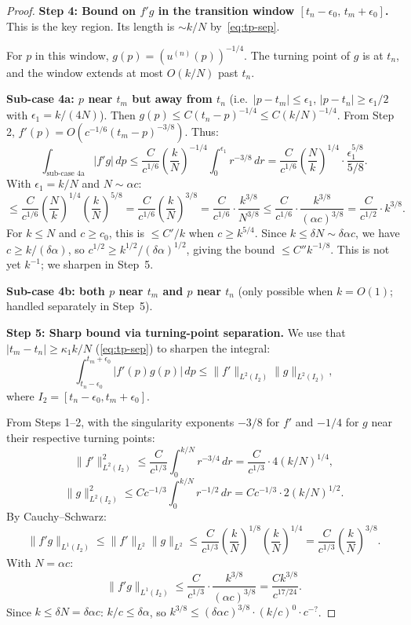 \documentclass[12pt,a4paper]{amsart}
\theoremstyle{definition}
\newcommand{\norm}[1]{\|#1\|}
\newcommand{\dd}{\,d}
\begin{document}
\begin{proof}
\medskip
\noindent\textbf{Step 4: Bound on $f' g$ in the transition window $[t_n - \epsilon_0,\, t_m + \epsilon_0]$.}
This is the key region. Its length is $\sim k/N$ by~\eqref{eq:tp-sep}.

For $p$ in this window, $g(p) = (u^{(n)}(p))^{-1/4}$.
The turning point of $g$ is at $t_n$, and the window
extends at most $O(k/N)$ past $t_n$.

\textbf{Sub-case 4a: $p$ near $t_m$ but away from $t_n$}
(i.e.\ $|p - t_m| \leq \epsilon_1$, $|p - t_n| \geq \epsilon_1/2$
with $\epsilon_1 = k/(4N)$).
Then $g(p) \leq C (t_n - p)^{-1/4} \leq C (k/N)^{-1/4}$.
From Step 2, $f'(p) = O(c^{-1/6}(t_m-p)^{-3/8})$. Thus:
\[
  \int_{\text{sub-case 4a}} |f'g|\dd p
  \leq \frac{C}{c^{1/6}}\left(\frac{k}{N}\right)^{-1/4}
      \int_0^{\epsilon_1} r^{-3/8}\dd r
  = \frac{C}{c^{1/6}}\left(\frac{N}{k}\right)^{1/4}
      \cdot \frac{\epsilon_1^{5/8}}{5/8}.
\]
With $\epsilon_1 = k/N$ and $N \sim \alpha c$:
\[
  \leq \frac{C}{c^{1/6}}\left(\frac{N}{k}\right)^{1/4}
    \left(\frac{k}{N}\right)^{5/8}
  = \frac{C}{c^{1/6}}\left(\frac{k}{N}\right)^{3/8}
  = \frac{C}{c^{1/6}}\cdot\frac{k^{3/8}}{N^{3/8}}
  \leq \frac{C}{c^{1/6}}\cdot\frac{k^{3/8}}{(\alpha c)^{3/8}}
  = \frac{C}{c^{1/2}}\cdot k^{3/8}.
\]
For $k \leq N$ and $c \geq c_0$, this is $\leq C' / k$ when $c \geq k^{5/4}$.
Since $k \leq \delta N \sim \delta\alpha c$, we have $c \geq k/(\delta\alpha)$,
so $c^{1/2} \geq k^{1/2}/(\delta\alpha)^{1/2}$,
giving the bound $\leq C'' k^{-1/8}$.
This is not yet $k^{-1}$; we sharpen in Step~5.

\textbf{Sub-case 4b: both $p$ near $t_m$ and $p$ near $t_n$}
(only possible when $k = O(1)$; handled separately in Step~5).

\medskip
\noindent\textbf{Step 5: Sharp bound via turning-point separation.}
We use that $|t_m - t_n| \geq \kappa_1 k/N$ (\eqref{eq:tp-sep})
to sharpen the integral:
\[
  \int_{t_n-\epsilon_0}^{t_m+\epsilon_0} |f'(p)g(p)|\dd p
  \leq \norm{f'}_{L^2(I_2)}\norm{g}_{L^2(I_2)},
\]
where $I_2 = [t_n - \epsilon_0, t_m + \epsilon_0]$.

From Steps 1--2, with the singularity exponents $-3/8$ for $f'$
and $-1/4$ for $g$ near their respective turning points:
\[
  \norm{f'}_{L^2(I_2)}^2
  \leq \frac{C}{c^{1/3}}\int_0^{k/N} r^{-3/4}\dd r
  = \frac{C}{c^{1/3}}\cdot 4(k/N)^{1/4},
\]
\[
  \norm{g}_{L^2(I_2)}^2
  \leq C c^{-1/3}\int_0^{k/N} r^{-1/2}\dd r
  = C c^{-1/3}\cdot 2(k/N)^{1/2}.
\]
By Cauchy--Schwarz:
\[
  \norm{f'g}_{L^1(I_2)}
  \leq \norm{f'}_{L^2}\norm{g}_{L^2}
  \leq \frac{C}{c^{1/3}}
       \left(\frac{k}{N}\right)^{1/8}
       \left(\frac{k}{N}\right)^{1/4}
  = \frac{C}{c^{1/3}}\left(\frac{k}{N}\right)^{3/8}.
\]
With $N = \alpha c$:
\[
  \norm{f'g}_{L^1(I_2)}
  \leq \frac{C}{c^{1/3}} \cdot \frac{k^{3/8}}{(\alpha c)^{3/8}}
  = \frac{C k^{3/8}}{c^{17/24}}.
\]
Since $k \leq \delta N = \delta\alpha c$:
$k/c \leq \delta\alpha$, so $k^{3/8} \leq (\delta\alpha c)^{3/8} \cdot (k/c)^0 \cdot c^{-?}$.


\end{proof}
\end{document}

